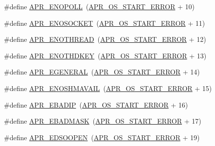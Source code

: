 \begin{DoxyCompactItemize}
\#define \hyperlink{group__APR__Error_gaeff8d4ed7bf9b99cbe62a3e7068e85b7}{A\+P\+R\+\_\+\+E\+N\+O\+P\+O\+LL}~(\hyperlink{group__apr__errno_ga191894048b7bd0cca3cf0bdff1eb695b}{A\+P\+R\+\_\+\+O\+S\+\_\+\+S\+T\+A\+R\+T\+\_\+\+E\+R\+R\+OR} + 10)
\item 
\#define \hyperlink{group__APR__Error_ga99e125e203a1d44f12bd88b41696716d}{A\+P\+R\+\_\+\+E\+N\+O\+S\+O\+C\+K\+ET}~(\hyperlink{group__apr__errno_ga191894048b7bd0cca3cf0bdff1eb695b}{A\+P\+R\+\_\+\+O\+S\+\_\+\+S\+T\+A\+R\+T\+\_\+\+E\+R\+R\+OR} + 11)
\item 
\#define \hyperlink{group__APR__Error_ga7b43e1e075ff031e142aa809295ee441}{A\+P\+R\+\_\+\+E\+N\+O\+T\+H\+R\+E\+AD}~(\hyperlink{group__apr__errno_ga191894048b7bd0cca3cf0bdff1eb695b}{A\+P\+R\+\_\+\+O\+S\+\_\+\+S\+T\+A\+R\+T\+\_\+\+E\+R\+R\+OR} + 12)
\item 
\#define \hyperlink{group__APR__Error_ga29faf801fac647a14360e7493f7fd74e}{A\+P\+R\+\_\+\+E\+N\+O\+T\+H\+D\+K\+EY}~(\hyperlink{group__apr__errno_ga191894048b7bd0cca3cf0bdff1eb695b}{A\+P\+R\+\_\+\+O\+S\+\_\+\+S\+T\+A\+R\+T\+\_\+\+E\+R\+R\+OR} + 13)
\item 
\#define \hyperlink{group__APR__Error_ga18f5678bea0c2c704a2b6a186c9e158b}{A\+P\+R\+\_\+\+E\+G\+E\+N\+E\+R\+AL}~(\hyperlink{group__apr__errno_ga191894048b7bd0cca3cf0bdff1eb695b}{A\+P\+R\+\_\+\+O\+S\+\_\+\+S\+T\+A\+R\+T\+\_\+\+E\+R\+R\+OR} + 14)
\item 
\#define \hyperlink{group__APR__Error_ga67516f4e87197490333480a8bbc78725}{A\+P\+R\+\_\+\+E\+N\+O\+S\+H\+M\+A\+V\+A\+IL}~(\hyperlink{group__apr__errno_ga191894048b7bd0cca3cf0bdff1eb695b}{A\+P\+R\+\_\+\+O\+S\+\_\+\+S\+T\+A\+R\+T\+\_\+\+E\+R\+R\+OR} + 15)
\item 
\#define \hyperlink{group__APR__Error_ga96180fb8075ae0150bfed50c2e7f7a59}{A\+P\+R\+\_\+\+E\+B\+A\+D\+IP}~(\hyperlink{group__apr__errno_ga191894048b7bd0cca3cf0bdff1eb695b}{A\+P\+R\+\_\+\+O\+S\+\_\+\+S\+T\+A\+R\+T\+\_\+\+E\+R\+R\+OR} + 16)
\item 
\#define \hyperlink{group__APR__Error_ga5249b5edc27466f6b60b3dfa1541ba31}{A\+P\+R\+\_\+\+E\+B\+A\+D\+M\+A\+SK}~(\hyperlink{group__apr__errno_ga191894048b7bd0cca3cf0bdff1eb695b}{A\+P\+R\+\_\+\+O\+S\+\_\+\+S\+T\+A\+R\+T\+\_\+\+E\+R\+R\+OR} + 17)
\item 
\#define \hyperlink{group__APR__Error_gac96fbde76282364e8c482d6f23bc61bb}{A\+P\+R\+\_\+\+E\+D\+S\+O\+O\+P\+EN}~(\hyperlink{group__apr__errno_ga191894048b7bd0cca3cf0bdff1eb695b}{A\+P\+R\+\_\+\+O\+S\+\_\+\+S\+T\+A\+R\+T\+\_\+\+E\+R\+R\+OR} + 19)
\item 

\end{DoxyCompactItemize}
